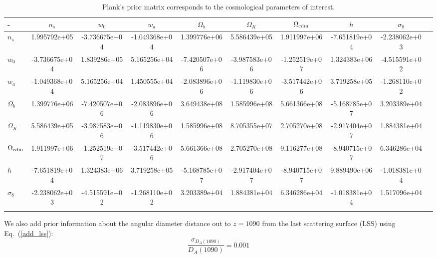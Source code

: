 \documentclass[useAMS,usenatbib]{mn2e}
\begin{document}
\begin{table}\label{tab:planck_prior}
\begin{tabular}{@{}lc|cccccccc}
\hline \hline
                        - &  $n_s$  &    $ w_0$                &         $ w_a$                &          $   \Omega_b$   &    $ \Omega_K $          &         $ \Omega_{\rm cdm} $    &$ h  $ &   $\sigma_8$  \\ \hline \hline 
              $n_s$    &  1.995792e+05 & -3.736675e+04 & -1.049368e+04   & 1.399776e+06
   & 5.586439e+05 &  1.911997e+06&  -7.651819e+04 & -2.238062e+03    \\
              $  w_0$ & -3.736675e+04 &  1.839286e+05 &  5.165256e+04  & -7.420507e+06
  & -3.987583e+06 & -1.252519e+07  & 1.324383e+06  & -4.515591e+02 \\
                $ w_a$& -1.049368e+04 &  5.165256e+04 &   1.450555e+04  & -2.083896e+06
  &  -1.119830e+06   & -3.517442e+06 &    3.719258e+05 & -1.268110e+02 \\
   $  \Omega_b$ & 1.399776e+06   &-7.420507e+06 &  -2.083896e+06 &  3.649438e+08
   & 1.585996e+08 &  5.661366e+08 &  -5.168785e+07 &  3.203389e+04  \\
     $\Omega_K $&  5.586439e+05  & -3.987583e+06 &  -1.119830e+06 &  1.585996e+08
  &  8.705355e+07 &  2.705270e+08 & -2.917404e+07 &  1.884381e+04 \\
    $ \Omega_{\rm cdm} $ &  1.911997e+06 & -1.252519e+07  & -3.517442e+06   & 5.661366e+08 &  2.705270e+08  & 9.116277e+08 & -8.940715e+07 &  6.346286e+04 \\
                  $  h$ &   -7.651819e+04  & 1.324383e+06 &  3.719258e+05  &-5.168785e+07
  & -2.917404e+07 & -8.940715e+07 &  9.889490e+06  & -1.018381e+04\\
  $\sigma_8$ & -2.238062e+03 & -4.515591e+02 &  -1.268110e+02 &  3.203389e+04
   & 1.884381e+04 &  6.346286e+04  & -1.018381e+04 &  1.517096e+04\\
   \\
\hline
\end{tabular}

\caption{Plank's prior matrix corresponds to the cosmological parameters of interest.}
\end{table}

We also add prior information about the
angular diameter distance out to $z=1090$  from the last scattering surface (LSS) using Eq.~(\ref{add_lss}):
\begin{equation}
\frac{\sigma_{D_A(1090)}}{D_A(1090)}= 0.001
\end{equation}
\end{document}
